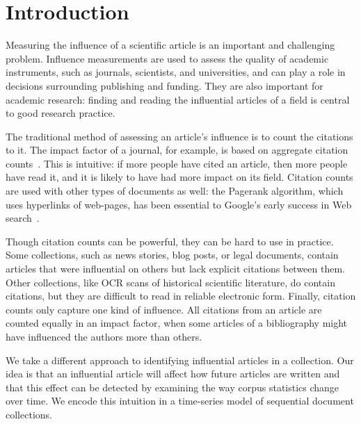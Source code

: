 \section{Introduction}

Measuring the influence of a scientific article is an important and
challenging problem.  Influence measurements are used to assess the
quality of academic instruments, such as journals, scientists, and
universities, and can play a role in decisions surrounding publishing
and funding.  They are also important for academic research: finding
and reading the influential articles of a field is central to good
research practice.


The traditional method of assessing an article's influence is to count
the citations to it.  The impact factor of a journal, for example, is
based on aggregate citation counts~\cite{garfield:2002}.  This is
intuitive: if more people have cited an article, then more people have
read it, and it is likely to have had more impact on its field.
Citation counts are used with other types of documents as well: the
Pagerank algorithm, which uses hyperlinks of web-pages, has been
essential to Google's early success in Web search~\cite{brin:1998}.

Though citation counts can be powerful, they can be hard to use in
practice.  Some collections, such as news stories, blog posts, or
legal documents, contain articles that were influential on others but
lack explicit citations between them.  Other collections, like OCR
scans of historical scientific literature, do contain citations, but
they are difficult to read in reliable electronic form.  Finally,
citation counts only capture one kind of influence.  All citations
from an article are counted equally in an impact factor, when some
articles of a bibliography might have influenced the authors more than
others.

We take a different approach to identifying influential articles in a
collection.  Our idea is that an influential article will affect how
future articles are written and that this effect can be detected by
examining the way corpus statistics change over time.  We encode this
intuition in a time-series model of sequential document collections.

